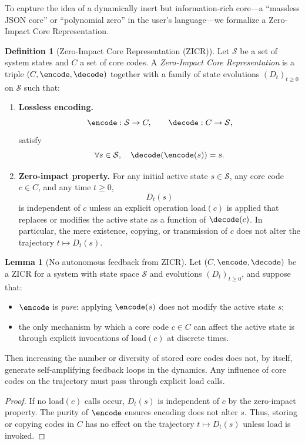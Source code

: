 \documentclass[11pt]{article}
\theoremstyle{definition}
\newtheorem{definition}{Definition}[section]
\newtheorem{lemma}{Lemma}[section]
\begin{document}
To capture the idea of a dynamically inert but information-rich core---a ``massless JSON core'' or ``polynomial zero'' in the user's language---we formalize a Zero-Impact Core Representation.

\begin{definition}[Zero-Impact Core Representation (ZICR)]
Let $\mathcal{S}$ be a set of system states and $C$ a set of core codes.
A \emph{Zero-Impact Core Representation} is a triple $(C,\encode,\decode)$ together with a family of state evolutions $(D_t)_{t\ge 0}$ on $\mathcal{S}$ such that:
\begin{enumerate}
    \item \textbf{Lossless encoding.}
    \[
        \encode : \mathcal{S} \to C,\qquad
        \decode : C \to \mathcal{S},
    \]
    satisfy
    \[
        \forall s \in \mathcal{S},\quad \decode(\encode(s)) = s.
    \]
    \item \textbf{Zero-impact property.}
    For any initial active state $s \in \mathcal{S}$, any core code $c \in C$, and any time $t \ge 0$,
    \[
        D_t(s)
    \]
    is independent of $c$ unless an explicit operation $\mathrm{load}(c)$ is applied that replaces or modifies the active state as a function of $\decode(c)$.
    In particular, the mere existence, copying, or transmission of $c$ does not alter the trajectory $t \mapsto D_t(s)$.
\end{enumerate}
\end{definition}

\begin{lemma}[No autonomous feedback from ZICR]
Let $(C,\encode,\decode)$ be a ZICR for a system with state space $\mathcal{S}$ and evolutions $(D_t)_{t\ge 0}$, and suppose that:
\begin{itemize}
    \item $\encode$ is \emph{pure}: applying $\encode(s)$ does not modify the active state $s$;
    \item the only mechanism by which a core code $c \in C$ can affect the active state is through explicit invocations of $\mathrm{load}(c)$ at discrete times.
\end{itemize}
Then increasing the number or diversity of stored core codes does not, by itself, generate self-amplifying feedback loops in the dynamics.
Any influence of core codes on the trajectory must pass through explicit $\mathrm{load}$ calls.
\end{lemma}

\begin{proof}
If no $\mathrm{load}(c)$ calls occur, $D_t(s)$ is independent of $c$ by the zero-impact property.
The purity of $\encode$ ensures encoding does not alter $s$.
Thus, storing or copying codes in $C$ has no effect on the trajectory $t \mapsto D_t(s)$ unless $\mathrm{load}$ is invoked.
\end{proof}
\end{document}
